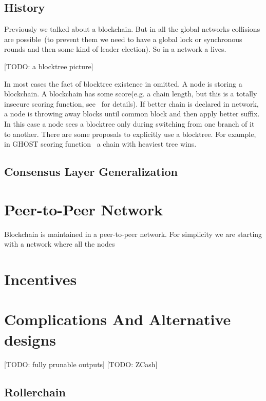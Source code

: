 \documentclass[]{report}   %
\begin{document}
\subsection{History}

Previously we talked about a blockchain. But in all the global networks collisions are possible~(to prevent them we need to have a global lock or synchronous rounds and then some kind of leader election). So in a network a  lives.

[TODO: a blocktree picture]

In most cases the fact of blocktree existence in omitted. A node is storing a blockchain. A blockchain has some score(e.g. a chain length, but this is a totally insecure scoring function, see~\cite{stackexchange} for details). If better chain is declared in network, a node is throwing away blocks until common block and then apply better suffix. In this case a node sees a blocktree only during switching from one branch of it to another. There are some proposals to explicitly use a blocktree. For example, in GHOST scoring function~\cite{sompolinsky2015secure} a chain with heaviest tree wins. 


\subsection{Consensus Layer Generalization}

\section{Peer-to-Peer Network}	

Blockchain is maintained in a peer-to-peer network. For simplicity we are starting with a network where all the nodes 

\section{Incentives}



\section{Complications And Alternative designs}

[TODO: fully prunable outputs]
[TODO: ZCash]



\subsection{Rollerchain}
\end{document}
